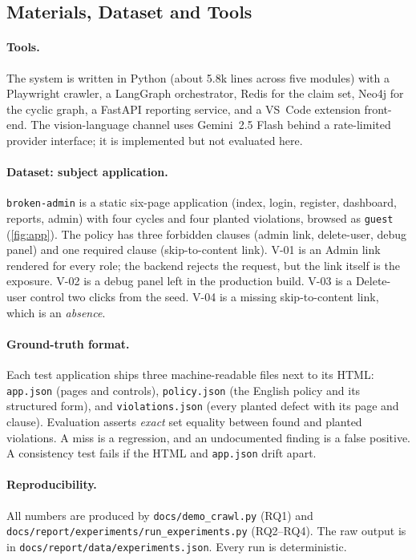 \subsection{Materials, Dataset and Tools}
\label{sec:materials}

\paragraph{Tools.}
The system is written in Python (about 5.8k lines across five modules) with a Playwright crawler, a LangGraph orchestrator, Redis for the claim set, Neo4j for the cyclic graph, a FastAPI reporting service, and a VS~Code extension front-end. The vision-language channel uses Gemini~2.5 Flash behind a rate-limited provider interface; it is implemented but not evaluated here.

\paragraph{Dataset: subject application.}
\texttt{broken-admin} is a static six-page application (index, login,
register, dashboard, reports, admin) with four cycles and four planted
violations, browsed as \texttt{guest} (\cref{fig:app}). The policy has three
forbidden clauses (admin link, delete-user, debug panel) and one required
clause (skip-to-content link). V-01 is an Admin link rendered for every role;
the backend rejects the request, but the link itself is the exposure. V-02 is
a debug panel left in the production build. V-03 is a Delete-user control two
clicks from the seed. V-04 is a missing skip-to-content link, which is an
\emph{absence}.

\paragraph{Ground-truth format.}
Each test application ships three machine-readable files next to its HTML:
\texttt{app.json} (pages and controls), \texttt{policy.json} (the English
policy and its structured form), and \texttt{violations.json} (every planted
defect with its page and clause). Evaluation asserts \emph{exact} set equality
between found and planted violations. A miss is a regression, and an
undocumented finding is a false positive. A consistency test fails if the HTML
and \texttt{app.json} drift apart.

\paragraph{Reproducibility.}
All numbers are produced by
\nolinkurl{docs/demo_crawl.py} (RQ1) and
\nolinkurl{docs/report/experiments/run_experiments.py} (RQ2--RQ4). The raw
output is in \nolinkurl{docs/report/data/experiments.json}. Every run is
deterministic.

